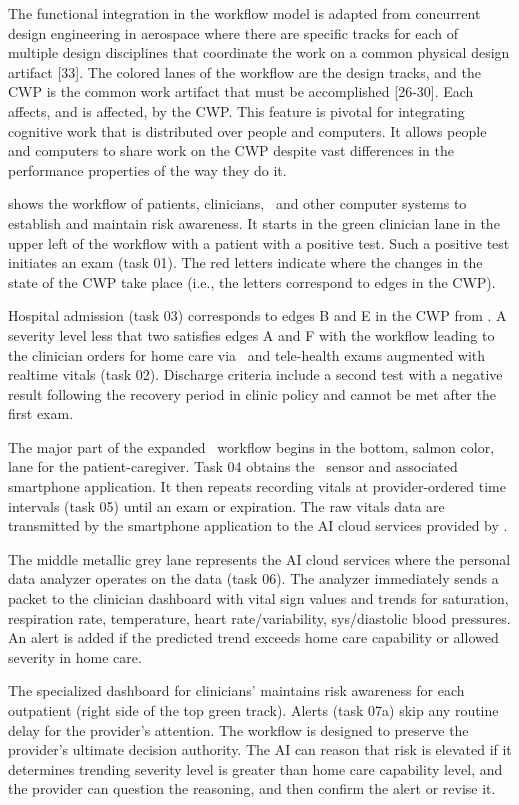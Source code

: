 The functional integration in the workflow model is adapted from concurrent design engineering in aerospace where there are specific tracks for each of multiple design disciplines that coordinate the work on a common physical design artifact [33]. The colored lanes of the workflow are the design tracks, and the CWP is the common work artifact that must be accomplished [26-30]. Each affects, and is affected, by the CWP. This feature is pivotal for integrating cognitive work that is distributed over people and computers. It allows people and computers to share work on the CWP despite vast differences in the performance properties of the way they do it. 

 shows the workflow of patients, clinicians, \phware\ and other computer systems to establish and maintain risk awareness. It starts in the green clinician lane in the upper left of the workflow with a patient with a positive test. Such a positive test initiates an exam (task 01). The red letters indicate where the changes in the state of the CWP take place (i.e., the letters correspond to edges in the CWP). 

Hospital admission (task 03) corresponds to edges B and E in the CWP from . A severity level less that two satisfies edges A and F with the workflow leading to the clinician orders for home care via \phware\ and tele-health exams augmented with realtime vitals (task 02). Discharge criteria include a second test with a negative result following the recovery period in clinic policy and cannot be met after the first exam.

The major part of the expanded \phware\ workflow begins in the bottom, salmon color, lane for the patient-caregiver. Task 04 obtains the \phware\ sensor and associated smartphone application. It then repeats recording vitals at provider-ordered time intervals (task 05) until an exam or expiration. The raw vitals data are transmitted by the smartphone application to the AI cloud services provided by \phware. 

The middle metallic grey lane represents the AI cloud services where the personal data analyzer operates on the data (task 06).  The analyzer immediately sends a packet to the clinician dashboard with vital sign values and trends for saturation, respiration rate, temperature, heart rate/variability, sys/diastolic blood pressures. An alert is added if the predicted trend exceeds home care capability or allowed severity in home care.

The specialized dashboard for clinicians’ maintains risk awareness for each outpatient (right side of the top green track). Alerts (task 07a) skip any routine delay for the provider’s attention. The workflow is designed to preserve the provider’s ultimate decision authority. The AI can reason that risk is elevated if it determines trending severity level is greater than home care capability level, and the provider can question the reasoning, and then confirm the alert or revise it. 


